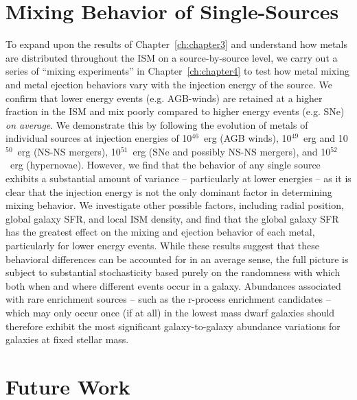 \section{Mixing Behavior of Single-Sources}
\label{conclusion:sec:ch4}

To expand upon the results of Chapter~\ref{ch:chapter3} and understand how metals are distributed throughout the ISM on a source-by-source level, we carry out a series of ``mixing experiments'' in Chapter~\ref{ch:chapter4} to test how metal mixing and metal ejection behaviors vary with the injection energy of the source. We confirm that lower energy events (e.g. AGB-winds) are retained at a higher fraction in the ISM and mix poorly compared to higher energy events (e.g. SNe) \textit{on average}. We demonstrate this by following the evolution of metals of individual sources at injection energies of 10$^{46}$~erg (AGB winds), 10$^{49}$~erg and 10$^{50}$~erg (NS-NS mergers), 10$^{51}$~erg (SNe and possibly NS-NS mergers), and 10$^{52}$~erg (hypernovae). However, we find that the behavior of any single source exhibits a substantial amount of variance -- particularly at lower energies -- as it is clear that the injection energy is not the only dominant factor in determining mixing behavior. We investigate other possible factors, including radial position, global galaxy SFR, and local ISM density, and find that the global galaxy SFR has the greatest effect on the mixing and ejection behavior of each metal, particularly for lower energy events. While these results suggest that these behavioral differences can be accounted for in an average sense, the full picture is subject to substantial stochasticity based purely on the randomness with which both when and where different events occur in a galaxy. Abundances associated with rare enrichment sources -- such as the r-process enrichment candidates -- which may only occur once (if at all) in the lowest mass dwarf galaxies should therefore exhibit the most significant galaxy-to-galaxy abundance variations for galaxies at fixed stellar mass.

\section{Future Work}
\label{conclusion:sec:future}

